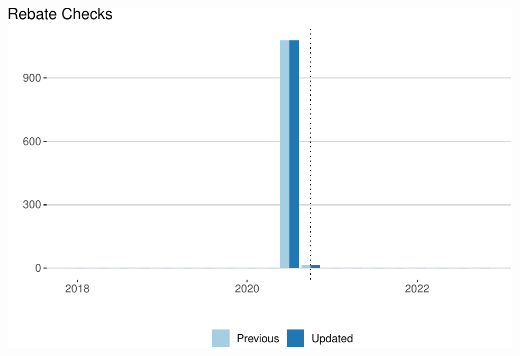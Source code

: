 \documentclass[
]{article}
\begin{document}
\begin{center}\includegraphics{update-changes-levels_files/figure-latex/rebate_checks-1} \end{center}
\end{document}

